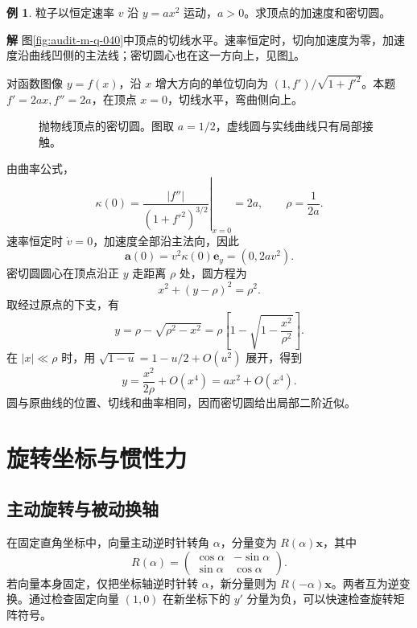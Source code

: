 \documentclass[11pt,openany,fontset=fandol]{ctexbook}
\theoremstyle{plain}\newtheorem{theorem}{定理}[chapter]\newtheorem{proposition}[theorem]{命题}
\theoremstyle{definition}\newtheorem{definition}{定义}[chapter]\newtheorem{example}{例}[chapter]
\theoremstyle{remark}\newtheorem*{remark}{说明}
\newcommand{\SolutionStart}{\par\nobreak\medskip\nobreak\noindent\textbf{解}\quad\ignorespaces}
\newenvironment{solution}{\SolutionStart}{\par\medskip}
\newcommand{\vct}[1]{\bm{#1}}\newcommand{\Rea}{\operatorname{Re}}\newcommand{\Ima}{\operatorname{Im}}
\begin{document}
\begin{example}
粒子以恒定速率 $v$ 沿 $y=ax^2$ 运动，$a>0$。求顶点的加速度和密切圆。
\end{example}

\begin{solution}
图\ref{fig:audit-m-q-040}中顶点的切线水平。速率恒定时，切向加速度为零，加速度沿曲线凹侧的主法线；密切圆心也在这一方向上，见图\ref{fig:orig-029}。

对函数图像 $y=f(x)$，沿 $x$ 增大方向的单位切向为 $(1,f')/\sqrt{1+f'^2}$。本题 $f'=2ax,f''=2a$，在顶点 $x=0$，切线水平，弯曲侧向上。

\begin{figure}[H]\centering
{}
\caption{抛物线顶点的密切圆。图取 $a=1/2$，虚线圆与实线曲线只有局部接触。}
\label{fig:orig-029}
\end{figure}

由曲率公式，
\[
\kappa(0)=\left.\frac{|f''|}{(1+f'^2)^{3/2}}\right|_{x=0}=2a,
\qquad\rho=\frac1{2a}.
\]
速率恒定时 $\dot v=0$，加速度全部沿主法向，因此
\[
\vct a(0)=v^2\kappa(0)\vct e_y=(0,2av^2).
\]
密切圆圆心在顶点沿正 $y$ 走距离 $\rho$ 处，圆方程为
\[
x^2+(y-\rho)^2=\rho^2.
\]
取经过原点的下支，有
\[
y=\rho-\sqrt{\rho^2-x^2}
=\rho\left[1-\sqrt{1-\frac{x^2}{\rho^2}}\right].
\]
在 $|x|\ll\rho$ 时，用 $\sqrt{1-u}=1-u/2+O(u^2)$ 展开，得到
\[
y=\frac{x^2}{2\rho}+O(x^4)=ax^2+O(x^4).
\]
圆与原曲线的位置、切线和曲率相同，因而密切圆给出局部二阶近似。

\end{solution}

\section{旋转坐标与惯性力}
\subsection{主动旋转与被动换轴}
在固定直角坐标中，向量主动逆时针转角 $\alpha$，分量变为 $R(\alpha)\vct x$，其中
\begin{equation}
R(\alpha)=\begin{pmatrix}\cos\alpha&-\sin\alpha\\\sin\alpha&\cos\alpha\end{pmatrix}.
\end{equation}
若向量本身固定，仅把坐标轴逆时针转 $\alpha$，新分量则为 $R(-\alpha)\vct x$。两者互为逆变换。通过检查固定向量 $(1,0)$ 在新坐标下的 $y'$ 分量为负，可以快速检查旋转矩阵符号。
\end{document}
